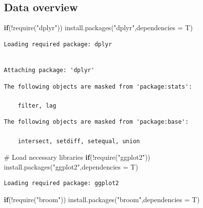 \documentclass[
  letterpaper,
  DIV=11,
  numbers=noendperiod]{scrreprt}
\newenvironment{Shaded}{\begin{snugshade}}{\end{snugshade}}
\newcommand{\AttributeTok}[1]{\textcolor[rgb]{0.40,0.45,0.13}{#1}}
\newcommand{\CommentTok}[1]{\textcolor[rgb]{0.37,0.37,0.37}{#1}}
\newcommand{\ControlFlowTok}[1]{\textcolor[rgb]{0.00,0.23,0.31}{\textbf{#1}}}
\newcommand{\FunctionTok}[1]{\textcolor[rgb]{0.28,0.35,0.67}{#1}}
\newcommand{\NormalTok}[1]{\textcolor[rgb]{0.00,0.23,0.31}{#1}}
\newcommand{\SpecialCharTok}[1]{\textcolor[rgb]{0.37,0.37,0.37}{#1}}
\newcommand{\StringTok}[1]{\textcolor[rgb]{0.13,0.47,0.30}{#1}}
\begin{document}
\subsection{Data overview}\label{data-overview}

\begin{Shaded}
\begin{Highlighting}[]
\ControlFlowTok{if}\NormalTok{(}\SpecialCharTok{!}\FunctionTok{require}\NormalTok{(}\StringTok{"dplyr"}\NormalTok{))}
  \FunctionTok{install.packages}\NormalTok{(}\StringTok{"dplyr"}\NormalTok{,}\AttributeTok{dependencies =}\NormalTok{ T)}
\end{Highlighting}
\end{Shaded}

\begin{verbatim}
Loading required package: dplyr
\end{verbatim}

\begin{verbatim}

Attaching package: 'dplyr'
\end{verbatim}

\begin{verbatim}
The following objects are masked from 'package:stats':

    filter, lag
\end{verbatim}

\begin{verbatim}
The following objects are masked from 'package:base':

    intersect, setdiff, setequal, union
\end{verbatim}

\begin{Shaded}
\begin{Highlighting}[]
\CommentTok{\# Load necessary libraries }
\ControlFlowTok{if}\NormalTok{(}\SpecialCharTok{!}\FunctionTok{require}\NormalTok{(}\StringTok{"ggplot2"}\NormalTok{))}
  \FunctionTok{install.packages}\NormalTok{(}\StringTok{"ggplot2"}\NormalTok{,}\AttributeTok{dependencies =}\NormalTok{ T)}
\end{Highlighting}
\end{Shaded}

\begin{verbatim}
Loading required package: ggplot2
\end{verbatim}

\begin{Shaded}
\begin{Highlighting}[]
\ControlFlowTok{if}\NormalTok{(}\SpecialCharTok{!}\FunctionTok{require}\NormalTok{(}\StringTok{"broom"}\NormalTok{))}
  \FunctionTok{install.packages}\NormalTok{(}\StringTok{"broom"}\NormalTok{,}\AttributeTok{dependencies =}\NormalTok{ T)}
\end{Highlighting}
\end{Shaded}
\end{document}
